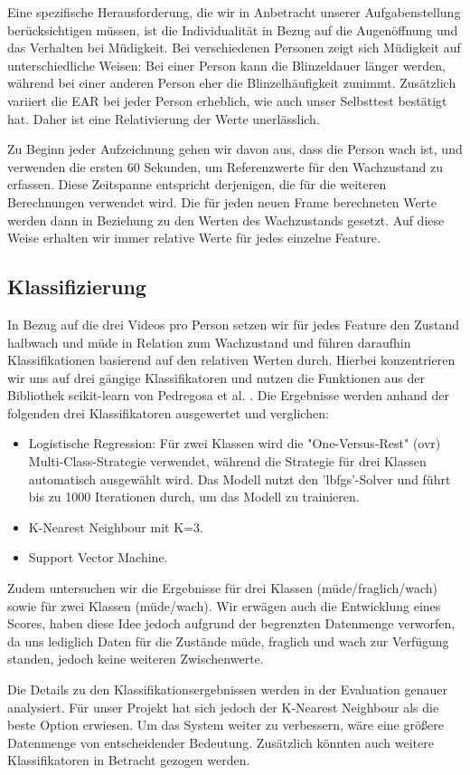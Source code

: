 Eine spezifische Herausforderung, die wir in Anbetracht unserer Aufgabenstellung berücksichtigen müssen, ist die Individualität in Bezug auf die Augenöffnung und das Verhalten bei Müdigkeit. Bei verschiedenen Personen zeigt sich Müdigkeit auf unterschiedliche Weisen: Bei einer Person kann die Blinzeldauer länger werden, während bei einer anderen Person eher die Blinzelhäufigkeit zunimmt. Zusätzlich variiert die EAR bei jeder Person erheblich, wie auch unser Selbsttest bestätigt hat. Daher ist eine Relativierung der Werte unerlässlich.

Zu Beginn jeder Aufzeichnung gehen wir davon aus, dass die Person wach ist, und verwenden die ersten 60 Sekunden, um Referenzwerte für den Wachzustand zu erfassen. Diese Zeitspanne entspricht derjenigen, die für die weiteren Berechnungen verwendet wird. Die für jeden neuen Frame berechneten Werte werden dann in Beziehung zu den Werten des Wachzustands gesetzt. Auf diese Weise erhalten wir immer relative Werte für jedes einzelne Feature.

\subsection{Klassifizierung}
\label{sec:classification}

In Bezug auf die drei Videos pro Person setzen wir für jedes Feature den Zustand halbwach und müde in Relation zum Wachzustand und führen daraufhin Klassifikationen basierend auf den relativen Werten durch. Hierbei konzentrieren wir uns auf drei gängige Klassifikatoren und nutzen die Funktionen aus der Bibliothek scikit-learn von Pedregosa et al. \cite{PE11}. Die Ergebnisse werden anhand der folgenden drei Klassifikatoren ausgewertet und verglichen:

\begin{itemize}
\item Logistische Regression: Für zwei Klassen wird die "One-Versus-Rest" (ovr) Multi-Class-Strategie verwendet, während die Strategie für drei Klassen automatisch ausgewählt wird. Das Modell nutzt den 'lbfgs'-Solver und führt bis zu 1000 Iterationen durch, um das Modell zu trainieren.
\item K-Nearest Neighbour mit K=3.
\item Support Vector Machine.
\end{itemize}

Zudem untersuchen wir die Ergebnisse für drei Klassen (müde/fraglich/wach) sowie für zwei Klassen (müde/wach). Wir erwägen auch die Entwicklung eines Scores, haben diese Idee jedoch aufgrund der begrenzten Datenmenge verworfen, da uns lediglich Daten für die Zustände müde, fraglich und wach zur Verfügung standen, jedoch keine weiteren Zwischenwerte.

Die Details zu den Klassifikationsergebnissen werden in der Evaluation genauer analysiert. Für unser Projekt hat sich jedoch der K-Nearest Neighbour als die beste Option erwiesen. Um das System weiter zu verbessern, wäre eine größere Datenmenge von entscheidender Bedeutung. Zusätzlich könnten auch weitere Klassifikatoren in Betracht gezogen werden.



